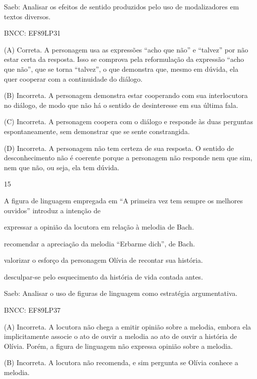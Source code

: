 Saeb: Analisar os efeitos de sentido produzidos pelo uso de
modalizadores em textos diversos.

BNCC: EF89LP31

(A) Correta. A personagem usa as expressões ``acho que não'' e
``talvez'' por não estar certa da resposta. Isso se comprova pela
reformulação da expressão ``acho que não'', que se torna ``talvez'', o
que demonstra que, mesmo em dúvida, ela quer cooperar com a continuidade
do diálogo.

(B) Incorreta. A personagem demonstra estar cooperando com sua
interlocutora no diálogo, de modo que não há o sentido de desinteresse
em sua última fala.

(C) Incorreta. A personagem coopera com o diálogo e responde às duas
perguntas espontaneamente, sem demonstrar que se sente constrangida.

(D) Incorreta. A personagem não tem certeza de sua resposta. O sentido
de desconhecimento não é coerente porque a personagem não responde nem
que sim, nem que não, ou seja, ela tem dúvida.

\num{15}

A figura de linguagem empregada em ``A primeira vez tem sempre os
melhores ouvidos'' introduz a intenção de

\begin{escolha}
\item expressar a opinião da locutora em relação à melodia de Bach.

\item recomendar a apreciação da melodia ``Erbarme dich'', de Bach.

\item valorizar o esforço da personagem Olívia de recontar sua história.

\item desculpar-se pelo esquecimento da história de vida contada antes.
\end{escolha}

Saeb: Analisar o uso de figuras de linguagem como estratégia
argumentativa.

BNCC: EF89LP37

(A) Incorreta. A locutora não chega a emitir opinião sobre a melodia,
embora ela implicitamente associe o ato de ouvir a melodia ao ato de
ouvir a história de Olívia. Porém, a figura de linguagem não expressa
opinião sobre a melodia.

(B) Incorreta. A locutora não recomenda, e sim pergunta se Olívia
conhece a melodia.

